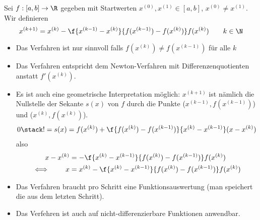 \documentclass[11pt]{scrartcl}
\begin{document}
\begin{df}[Sekantenverfahren] \label{3.5}
	Sei $f:[a,b] \to \R$ gegeben mit Startwerten $x^{(0)}, x^{(1)} \in [a,b]$, $x^{(0)} \neq x^{(1)}$.
	Wir definieren
	\[
		x^{(k+1)} = x^{(k)} - \f {x^{(k-1)} - x^{(k)}}{f(x^{(k-1)}) - f(x^{(k)})} f(x^{(k)})
		\qquad k\in \N
	\]
	\begin{note}
		\begin{itemize}
			\item
				Das Verfahren ist nur sinnvoll falls $f(x^{(k)}) \neq f(x^{(k-1)})$ für alle $k$
			\item
				Das Verfahren entspricht dem Newton-Verfahren mit Differenzenquotienten anstatt $f'(x^{(k)})$.
			\item
				Es ist auch eine geometrische Interpretation möglich:
				$x^{(k+1)}$ ist nämlich die Nullstelle der Sekante $s(x)$ von $f$ durch die Punkte ($x^{(k-1)}, f(x^{(k-1)})$) und ($x^{(k)},f(x^{(k)})$).
				\begin{align*}
					0 \stack != s(x) = f(x^{(k)}) + \f {f(x^{(k)})-f(x^{(k-1)})}{x^{(k)}-x^{(k-1)}} (x-x^{(k)})
				\end{align*}
				also
				\begin{align*}
					x-x^{(k)} &= - \f {x^{(k)}-x^{(k-1)}}{f(x^{(k)}) - f(x^{(k-1)})} f(x^{(k)}) \\
					\iff \qquad
					x &= x^{(k)} - \f {x^{(k)}-x^{(k-1)}}{f(x^{(k)}) - f(x^{(k-1)})} f(x^{(k)})
				\end{align*}
			\item
				Das Verfahren braucht pro Schritt eine Funktionsauswertung (man speichert die aus dem letzten Schritt).
			\item
				Das Verfehren ist auch auf nicht-differenzierbare Funktionen anwendbar.
		\end{itemize}
	\end{note}
\end{df}
\end{document}
